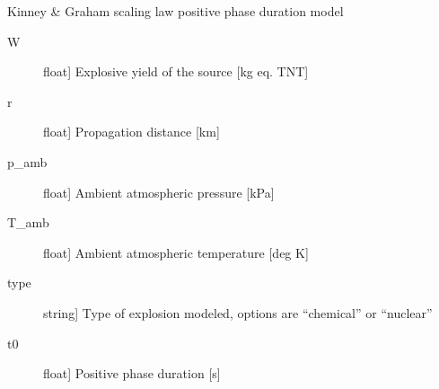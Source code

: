 \documentclass[letterpaper,10pt,english]{sphinxmanual}
\begin{document}
\begin{fulllineitems}
\label{\detokenize{infrapy.characterization:infrapy.characterization.spye.kg_ppd}}
Kinney \& Graham scaling law positive phase duration model
\begin{description}
\item[{W}] \leavevmode{[}float{]}
Explosive yield of the source {[}kg eq. TNT{]}

\item[{r}] \leavevmode{[}float{]}
Propagation distance {[}km{]}

\item[{p\_amb}] \leavevmode{[}float{]}
Ambient atmospheric pressure {[}kPa{]}

\item[{T\_amb}] \leavevmode{[}float{]}
Ambient atmospheric temperature {[}deg K{]}

\item[{type}] \leavevmode{[}string{]}
Type of explosion modeled, options are “chemical” or “nuclear”

\end{description}
\begin{description}
\item[{t0}] \leavevmode{[}float{]}
Positive phase duration {[}s{]}

\end{description}

\end{fulllineitems}

\end{document}
